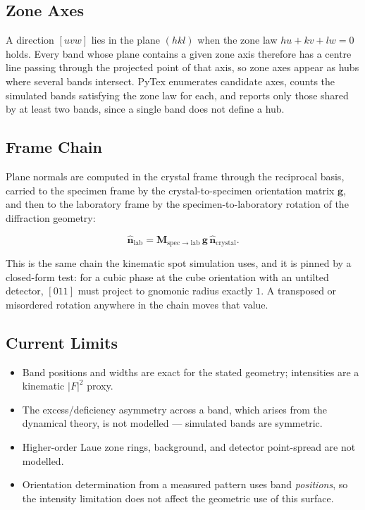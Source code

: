 \subsection{Zone Axes}

A direction $[uvw]$ lies in the plane $(hkl)$ when the zone law
$hu + kv + lw = 0$ holds. Every band whose plane contains a given zone axis
therefore has a centre line passing through the projected point of that axis, so
zone axes appear as hubs where several bands intersect. PyTex enumerates
candidate axes, counts the simulated bands satisfying the zone law for each, and
reports only those shared by at least two bands, since a single band does not
define a hub.

\subsection{Frame Chain}

Plane normals are computed in the crystal frame through the reciprocal basis,
carried to the specimen frame by the crystal-to-specimen orientation matrix
$\mathbf{g}$, and then to the laboratory frame by the specimen-to-laboratory
rotation of the diffraction geometry:

\[
  \hat{\mathbf{n}}_{\mathrm{lab}}
    = \mathbf{M}_{\mathrm{spec} \rightarrow \mathrm{lab}} \,
      \mathbf{g} \, \hat{\mathbf{n}}_{\mathrm{crystal}} .
\]

This is the same chain the kinematic spot simulation uses, and it is pinned by a
closed-form test: for a cubic phase at the cube orientation with an untilted
detector, $[011]$ must project to gnomonic radius exactly $1$. A transposed or
misordered rotation anywhere in the chain moves that value.

\subsection{Current Limits}

\begin{itemize}
  \item Band positions and widths are exact for the stated geometry; intensities
        are a kinematic $\lvert F \rvert^2$ proxy.
  \item The excess/deficiency asymmetry across a band, which arises from the
        dynamical theory, is not modelled --- simulated bands are symmetric.
  \item Higher-order Laue zone rings, background, and detector point-spread are
        not modelled.
  \item Orientation determination from a measured pattern uses band
        \emph{positions}, so the intensity limitation does not affect the
        geometric use of this surface.
\end{itemize}
